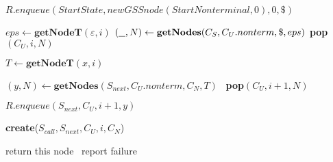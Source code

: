 \begin{algorithmic}
    \State $R.enqueue(StartState, new GSSnode(StartNonterminal,0), 0, \$)$
    
    \State $eps \gets \textbf{getNodeT}(\varepsilon, i)$  
    \State $(\underline{\hspace{0.25cm}}, N) \gets \textbf{getNodes}(C_{S},C_{U}.nonterm, \$, eps)$
    \State \textbf{pop}$(C_{U},i,N)$ 
    \EndIf
    
            \State $T \gets \textbf{getNodeT}(x, i)$
            
            \State $(y, N) \gets \textbf{getNodes}(S_{next},C_{U}.nonterm, C_{N}, T)$
                \ \textbf{pop}$(C_{U},i+1,N)$ 
            \EndIf
            
            \State $R.enqueue(S_{next}, C_{U}, i + 1, y)$
            
        \EndCase
    
            \State \textbf{create}($S_{call}, S_{next}, C_{U}, i, C_{N}$)
        \EndCase
        \EndSwitch
        
    \EndFor
    \EndWhile
    \State return this node
    \Else
    \ report failure
    \EndIf
\EndFunction
\end{algorithmic}